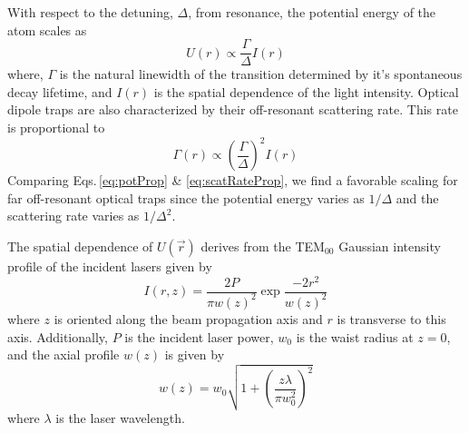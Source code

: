 With respect to the detuning, $\Delta$, from resonance, the potential energy of the atom scales as
\begin{equation} \label{eq:potProp}
	U(r) \varpropto \frac{\Gamma}{\Delta}I(r)
\end{equation}
where, $\Gamma$ is the natural linewidth of the transition determined by it's spontaneous decay lifetime, and $I(r)$ is the spatial dependence of the light intensity.
Optical dipole traps are also characterized by their off-resonant scattering rate.
This rate is proportional to
\begin{equation} \label{eq:scatRateProp}
	\Gamma(r) \varpropto \left(\frac{\Gamma}{\Delta}\right)^2 I(r)
\end{equation}
Comparing Eqs.\,\ref{eq:potProp} \& \ref{eq:scatRateProp}, we find a favorable scaling for far off-resonant optical traps since the potential energy varies as $1/\Delta$ and the scattering rate varies as $1/\Delta^2$. 

The spatial dependence of $U(\vec{r})$ derives from the TEM$_{00}$ Gaussian intensity profile of the incident lasers given by
\begin{equation} \label{eq:gaussInt}
	I(r,z) = \frac{2P}{\pi w(z)^2} \exp{\frac{-2 r^2}{w(z)^2}}
\end{equation}
where $z$ is oriented along the beam propagation axis and $r$ is transverse to this axis.
Additionally, $P$ is the incident laser power, $w_0$ is the waist radius at $z=0$, and the axial profile $w(z)$ is given by
\begin{equation} \label{eq:gaussSpot}
	w(z) = w_0 \sqrt{1 + \left( \frac{z \lambda}{\pi w_0^2} \right)^2}
\end{equation}
where $\lambda$ is the laser wavelength.

